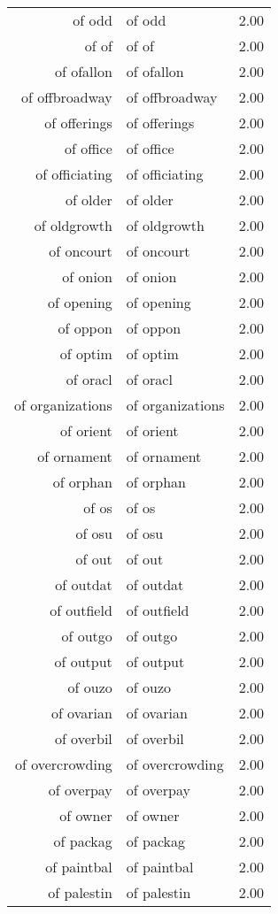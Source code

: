 \begin{table}[ht]
\begin{tabular}{rlr}
  of odd & of odd & 2.00 \\ 
  of of & of of & 2.00 \\ 
  of ofallon & of ofallon & 2.00 \\ 
  of offbroadway & of offbroadway & 2.00 \\ 
  of offerings & of offerings & 2.00 \\ 
  of office & of office & 2.00 \\ 
  of officiating & of officiating & 2.00 \\ 
  of older & of older & 2.00 \\ 
  of oldgrowth & of oldgrowth & 2.00 \\ 
  of oncourt & of oncourt & 2.00 \\ 
  of onion & of onion & 2.00 \\ 
  of opening & of opening & 2.00 \\ 
  of oppon & of oppon & 2.00 \\ 
  of optim & of optim & 2.00 \\ 
  of oracl & of oracl & 2.00 \\ 
  of organizations & of organizations & 2.00 \\ 
  of orient & of orient & 2.00 \\ 
  of ornament & of ornament & 2.00 \\ 
  of orphan & of orphan & 2.00 \\ 
  of os & of os & 2.00 \\ 
  of osu & of osu & 2.00 \\ 
  of out & of out & 2.00 \\ 
  of outdat & of outdat & 2.00 \\ 
  of outfield & of outfield & 2.00 \\ 
  of outgo & of outgo & 2.00 \\ 
  of output & of output & 2.00 \\ 
  of ouzo & of ouzo & 2.00 \\ 
  of ovarian & of ovarian & 2.00 \\ 
  of overbil & of overbil & 2.00 \\ 
  of overcrowding & of overcrowding & 2.00 \\ 
  of overpay & of overpay & 2.00 \\ 
  of owner & of owner & 2.00 \\ 
  of packag & of packag & 2.00 \\ 
  of paintbal & of paintbal & 2.00 \\ 
  of palestin & of palestin & 2.00 \\ 

\end{tabular}
\end{table}
